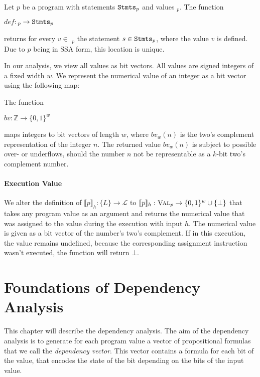 \begin{definition}
    Let $p$ be a program with statements $\mathtt{Stmts}_p$ and values \val$_p$. The function
    \begin{center}
        $def: $\val$_p \to \mathtt{Stmts}_p$
    \end{center}
    returns for every $v \in$ \val$_p$ the statement $s \in \mathtt{Stmts}_p$, where the value $v$ is defined. Due to $p$ being in SSA form, this location is unique.
\end{definition}

In our analysis, we view all values as bit vectors. All values are signed integers of a fixed width $w$. We represent the numerical value of an integer as a bit vector using the following map:

\begin{definition}
    The function
    \begin{center}
        $bv: \mathbb{Z} \to \{0, 1\}^w$
    \end{center}
    maps integers to bit vectors of length $w$, where $bv_w(n)$ is the two's complement representation of the integer $n$.
    The returned value $bv_w(n)$ is subject to possible over- or underflows, should the number $n$ not be representable as a $k$-bit two's complement number.
\end{definition}

\paragraph{Execution Value}
We alter the definition of $\llbracket p \rrbracket_h: \{L\} \to \mathcal{L}$ to  $\llbracket p \rrbracket_h: \textsc{Val}_p \to \{0, 1\}^w \cup \{\bot\}$ that takes any program value as an argument and returns the numerical value that was assigned to the value during the execution with input $h$. The numerical value is given as a bit vector of the number's two's complement. If in this execution, the value remains undefined, because the corresponding assignment instruction wasn't executed, the function will return $\bot$.

\section{Foundations of Dependency Analysis}\label{sec:prop}

This chapter will describe the dependency analysis. The aim of the dependency analysis is to generate for each program value a vector of propositional formulas that we call the \emph{dependency vector}. This vector contains a formula for each bit of the value, that encodes the state of the bit depending on the bits of the input value.

